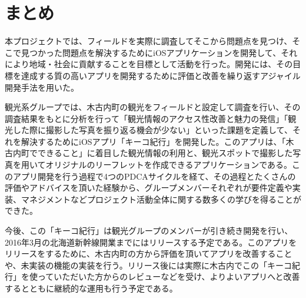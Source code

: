 \section{まとめ}
本プロジェクトでは、フィールドを実際に調査してそこから問題点を見つけ、そこで見つかった問題点を解決するためにiOSアプリケーションを開発して、それにより地域・社会に貢献することを目標として活動を行った。開発には、その目標を達成する質の高いアプリを開発するために評価と改善を繰り返すアジャイル開発手法を用いた。\\
\par 観光系グループでは、木古内町の観光をフィールドと設定して調査を行い、その調査結果をもとに分析を行って「観光情報のアクセス性改善と魅力の発信」「観光した際に撮影した写真を振り返る機会が少ない」といった課題を定義して、それを解決するためにiOSアプリ「キーコ紀行」を開発した。このアプリは、「木古内町でできること」に着目した観光情報の利用と、観光スポットで撮影した写真を用いてオリジナルのリーフレットを作成できるアプリケーションである。このアプリ開発を行う過程で4つのPDCAサイクルを経て、その過程とたくさんの評価やアドバイスを頂いた経験から、グループメンバーそれぞれが要件定義や実装、マネジメントなどプロジェクト活動全体に関する数多くの学びを得ることができた。\\
\par 今後、この「キーコ紀行」は観光グループのメンバーが引き続き開発を行い、2016年3月の北海道新幹線開業までにはリリースする予定である。このアプリをリリースをするために、木古内町の方から評価を頂いてアプリを改善することや、未実装の機能の実装を行う。リリース後には実際に木古内でこの「キーコ紀行」を使っていただいた方からのレビューなどを受け、よりよいアプリへと改善するとともに継続的な運用も行う予定である。
